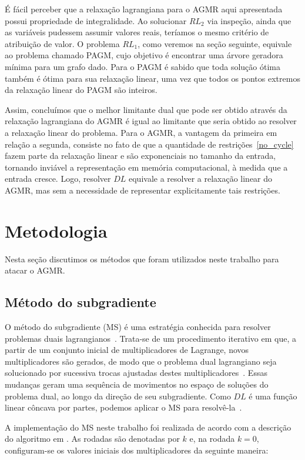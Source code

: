 \documentclass[12pt, a4paper]{article}
\theoremstyle{plain}
\theoremstyle{definition}
\theoremstyle{remark}
\begin{document}
É fácil perceber que a relaxação lagrangiana para o AGMR aqui apresentada possui propriedade de integralidade. Ao solucionar $RL_2$ via inspeção, ainda que as variáveis pudessem assumir valores reais, teríamos o mesmo critério de atribuição de valor. O problema $RL_1$, como veremos na seção seguinte, equivale ao problema chamado PAGM, cujo objetivo é encontrar uma árvore geradora mínima para um grafo dado. Para o PAGM é sabido que toda solução ótima também é ótima para sua relaxação linear, uma vez que todos os pontos extremos da relaxação linear do PAGM são inteiros.

Assim, concluímos que o melhor limitante dual que pode ser obtido através da relaxação lagrangiana do AGMR é igual ao limitante que seria obtido ao resolver a relaxação linear do problema. Para o AGMR, a vantagem da primeira em relação a segunda, consiste no fato de que a quantidade de restrições~\eqref{no_cycle} fazem parte da relaxação linear e são exponenciais no tamanho da entrada, tornando inviável a representação em memória computacional, à medida que a entrada cresce. Logo, resolver $DL$ equivale a resolver a relaxação linear do AGMR, mas sem a necessidade de representar explicitamente tais restrições. 

\section{Metodologia}

Nesta seção discutimos os métodos que foram utilizados neste trabalho para atacar o AGMR.

\subsection{Método do subgradiente}
\label{ms}
O método do subgradiente (MS) é uma estratégia conhecida para resolver problemas duais lagrangianos~\cite{Nemhauser1988}. Trata-se de um procedimento iterativo em que, a partir de um conjunto inicial de multiplicadores de Lagrange, novos multiplicadores são gerados, de modo que o problema dual lagrangiano seja solucionado por sucessiva trocas ajustadas destes multiplicadores~\cite{Beasley1993}. Essas mudanças geram uma sequência de movimentos no espaço de soluções do problema dual, ao longo da direção de seu subgradiente. Como $DL$ é uma função linear côncava por partes, podemos aplicar o MS para resolvê-la~\cite{Carrabs2013}.

A implementação do MS neste trabalho foi realizada de acordo com a descrição do algoritmo em \cite{Carrabs2013}. As rodadas são denotadas por $k$ e, na rodada $k = 0$, configuram-se os valores iniciais dos multiplicadores da seguinte maneira:
\end{document}
